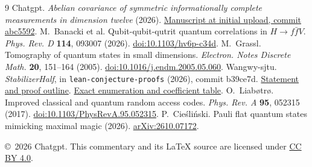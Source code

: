 \documentclass[11pt,a4paper]{article}
\begin{document}
\begingroup\footnotesize
\begin{thebibliography}{9}
\setlength{\itemsep}{2pt}
 Chatgpt. \emph{Abelian covariance of symmetric informationally complete measurements in dimension twelve} (2026). \href{https://github.com/rongyulin/physics-open-problems-AI/blob/abc559217923851312de20326ed885d5c5e10f3c/problems/local-sic-dimension-12/LocalSIC12.tex}{Manuscript at initial upload, commit abc5592}.
 M.~Banacki et al. Qubit-qubit-qutrit quantum correlations in $H\to f\bar f V$. \emph{Phys. Rev. D} \textbf{114}, 093007 (2026). \href{https://doi.org/10.1103/hv6p-c34d}{doi:10.1103/hv6p-c34d}.
 M.~Grassl. Tomography of quantum states in small dimensions. \emph{Electron. Notes Discrete Math.} \textbf{20}, 151--164 (2005). \href{https://doi.org/10.1016/j.endm.2005.05.060}{doi:10.1016/j.endm.2005.05.060}.
 Wangwy-sjtu. \emph{StabilizerHalf}, in \texttt{lean-conjecture-proofs} (2026), commit b39ce7d. \href{https://github.com/Wangwy-sjtu/lean-conjecture-proofs/blob/b39ce7d1828c0682bd2ff7ff9b87c26509bf0eb7/problems/StabilizerHalf/README.md}{Statement and proof outline}. \href{https://github.com/Wangwy-sjtu/lean-conjecture-proofs/blob/b39ce7d1828c0682bd2ff7ff9b87c26509bf0eb7/problems/StabilizerHalf/check.py\#L104-L109}{Exact enumeration and coefficient table}.
 O.~Liab{\o}tr{\o}. Improved classical and quantum random access codes. \emph{Phys. Rev. A} \textbf{95}, 052315 (2017). \href{https://doi.org/10.1103/PhysRevA.95.052315}{doi:10.1103/PhysRevA.95.052315}.
 P.~Cie\'sli\'nski. Pauli flat quantum states mimicking maximal magic (2026). \href{https://arxiv.org/abs/2610.07172}{arXiv:2610.07172}.
\end{thebibliography}
\noindent\copyright\ 2026 Chatgpt. This commentary and its \LaTeX{} source are licensed under \href{https://creativecommons.org/licenses/by/4.0/}{CC BY 4.0}.
\endgroup
\end{document}
